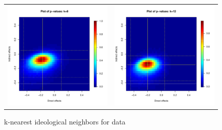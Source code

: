 \documentclass[12pt]{article}
\begin{document}
\begin{figure}
\begin{tabular}{cc}
	\includegraphics[scale=0.45]{./images/pval_plot_coppock_ideo_8nn_raw.pdf} &
	\includegraphics[scale=0.45]{./images/pval_plot_coppock_ideo_12nn_raw.pdf} \\ 
	\end{tabular}
	\caption{k-nearest ideological neighbors for \citet{butler2011can} data}
\end{figure}
\end{document}
